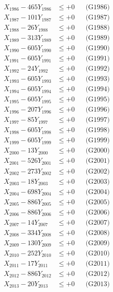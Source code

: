\documentclass[a4paper,10pt]{article}
\begin{document}
{\begin{align}
X_{1986} - 465Y_{1986} &\leq +0 && \text{(G1986)} \\
X_{1987} - 101Y_{1987} &\leq +0 && \text{(G1987)} \\
X_{1988} - 26Y_{1988} &\leq +0 && \text{(G1988)} \\
X_{1989} - 313Y_{1989} &\leq +0 && \text{(G1989)} \\
X_{1990} - 605Y_{1990} &\leq +0 && \text{(G1990)} \\
\allowbreak
X_{1991} - 605Y_{1991} &\leq +0 && \text{(G1991)} \\
X_{1992} - 24Y_{1992} &\leq +0 && \text{(G1992)} \\
X_{1993} - 605Y_{1993} &\leq +0 && \text{(G1993)} \\
X_{1994} - 605Y_{1994} &\leq +0 && \text{(G1994)} \\
X_{1995} - 605Y_{1995} &\leq +0 && \text{(G1995)} \\
X_{1996} - 207Y_{1996} &\leq +0 && \text{(G1996)} \\
X_{1997} - 85Y_{1997} &\leq +0 && \text{(G1997)} \\
X_{1998} - 605Y_{1998} &\leq +0 && \text{(G1998)} \\
X_{1999} - 605Y_{1999} &\leq +0 && \text{(G1999)} \\
X_{2000} - 13Y_{2000} &\leq +0 && \text{(G2000)} \\
\allowbreak
X_{2001} - 526Y_{2001} &\leq +0 && \text{(G2001)} \\
X_{2002} - 273Y_{2002} &\leq +0 && \text{(G2002)} \\
X_{2003} - 18Y_{2003} &\leq +0 && \text{(G2003)} \\
X_{2004} - 698Y_{2004} &\leq +0 && \text{(G2004)} \\
X_{2005} - 886Y_{2005} &\leq +0 && \text{(G2005)} \\
X_{2006} - 886Y_{2006} &\leq +0 && \text{(G2006)} \\
X_{2007} - 14Y_{2007} &\leq +0 && \text{(G2007)} \\
X_{2008} - 334Y_{2008} &\leq +0 && \text{(G2008)} \\
X_{2009} - 130Y_{2009} &\leq +0 && \text{(G2009)} \\
X_{2010} - 252Y_{2010} &\leq +0 && \text{(G2010)} \\
\allowbreak
X_{2011} - 17Y_{2011} &\leq +0 && \text{(G2011)} \\
X_{2012} - 886Y_{2012} &\leq +0 && \text{(G2012)} \\
X_{2013} - 20Y_{2013} &\leq +0 && \text{(G2013)} \\

\end{align}}
\end{document}
